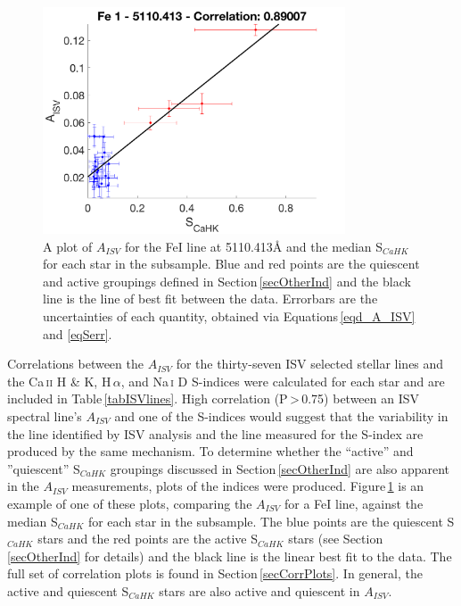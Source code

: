 \begin{figure}
    \centering
    \includegraphics[width=0.8\textwidth]{CorrPlots/CaHK_25.png}
    \caption{A plot of $A_{ISV}$ for the Fe\textsc{I} line at 5110.413\hbox{\AA} and the median S$_{CaHK}$ for each star in the subsample. Blue and red points are the quiescent and active groupings defined in Section\,\ref{secOtherInd} and the black line is the line of best fit between the data. Errorbars are the uncertainties of each quantity, obtained via Equations\,\ref{eqd_A_ISV} and \ref{eqSerr}.}
    \label{figCorrPlotExample}
\end{figure}

Correlations between the $A_{ISV}$ for the thirty-seven ISV selected stellar lines and the Ca\,\textsc{ii} H \& K, H\,\textsc{$\alpha$}, and Na\,\textsc{i} D S-indices were calculated for each star and are included in Table\,\ref{tabISVlines}. High correlation (P\,\textgreater\,0.75) between an ISV spectral line's $A_{ISV}$ and one of the S-indices would suggest that the variability in the line identified by ISV analysis and the line measured for the S-index are produced by the same mechanism. To determine whether the ``active'' and ''quiescent'' S$_{CaHK}$ groupings discussed in Section\,\ref{secOtherInd} are also apparent in the $A_{ISV}$ measurements, plots of the indices were produced. Figure\,\ref{figCorrPlotExample} is an example of one of these plots, comparing the $A_{ISV}$ for a Fe\textsc{I} line, against the median S$_{CaHK}$ for each star in the subsample. The blue points are the quiescent S$_{CaHK}$ stars and the red points are the active S$_{CaHK}$ stars (see Section\,\ref{secOtherInd} for details) and the black line is the linear best fit to the data. The full set of correlation plots is found in Section\,\ref{secCorrPlots}. In general, the active and quiescent S$_{CaHK}$ stars are also active and quiescent in $A_{ISV}$.\\

